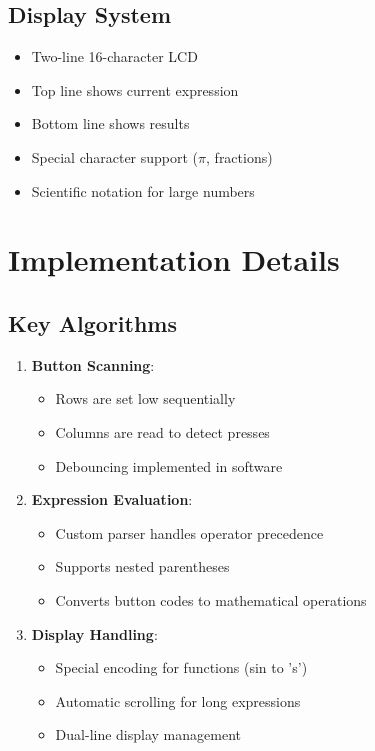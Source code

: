 \documentclass{article}
\begin{document}
\subsection{Display System}
\begin{itemize}
    \item Two-line 16-character LCD
    \item Top line shows current expression
    \item Bottom line shows results
    \item Special character support ($\pi$, fractions)
    \item Scientific notation for large numbers
\end{itemize}

\section{Implementation Details}

\subsection{Key Algorithms}
\begin{enumerate}
    \item \textbf{Button Scanning}:
    \begin{itemize}
        \item Rows are set low sequentially
        \item Columns are read to detect presses
        \item Debouncing implemented in software
    \end{itemize}
    
    \item \textbf{Expression Evaluation}:
    \begin{itemize}
        \item Custom parser handles operator precedence
        \item Supports nested parentheses
        \item Converts button codes to mathematical operations
    \end{itemize}
    
    \item \textbf{Display Handling}:
    \begin{itemize}
        \item Special encoding for functions (sin to 's')
        \item Automatic scrolling for long expressions
        \item Dual-line display management
    \end{itemize}
\end{enumerate}
\end{document}
